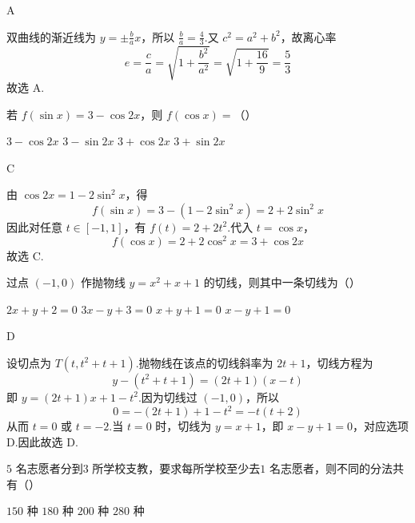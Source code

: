 \begin{answer}
A
\end{answer}

\begin{solution}
双曲线的渐近线为 \(y=\pm\frac{b}{a}x\)，所以
\(\frac{b}{a}=\frac43\).又 \(c^{2}=a^{2}+b^{2}\)，故离心率
\[
e=\frac ca=\sqrt{1+\frac{b^{2}}{a^{2}}}=\sqrt{1+\frac{16}{9}}=\frac53
\]
故选 A.
\end{solution}

\begin{problem}
若 \( f(\sin x) = 3 - \cos 2x \)，则 \( f(\cos x) = \)（\quad）

\choices
    {\(3 - \cos 2x\)}
    {\(3 - \sin 2x\)}
    {\(3 + \cos 2x\)}
    {\(3 + \sin 2x\)}
\end{problem}

\begin{answer}
C
\end{answer}

\begin{solution}
由 \(\cos2x=1-2\sin^{2}x\)，得
\[
f(\sin x)=3-(1-2\sin^{2}x)=2+2\sin^{2}x
\]
因此对任意 \(t\in[-1,1]\)，有 \(f(t)=2+2t^{2}\).代入 \(t=\cos x\)，
\[
f(\cos x)=2+2\cos^{2}x=3+\cos2x
\]
故选 C.
\end{solution}

\begin{problem}
过点 \((-1,0)\) 作抛物线 \(y = x^{2} + x + 1\) 的切线，则其中一条切线为（\quad）

\choices
    {\(2x + y + 2 = 0\)}
    {\(3x - y + 3 = 0\)}
    {\(x + y + 1 = 0\)}
    {\(x - y + 1 = 0\)}
\end{problem}

\begin{answer}
D
\end{answer}

\begin{solution}
设切点为 \(T(t,t^{2}+t+1)\).抛物线在该点的切线斜率为 \(2t+1\)，切线方程为
\[
y-(t^{2}+t+1)=(2t+1)(x-t)
\]
即 \(y=(2t+1)x+1-t^{2}\).因为切线过 \((-1,0)\)，所以
\[
0=-(2t+1)+1-t^{2}=-t(t+2)
\]
从而 \(t=0\) 或 \(t=-2\).当 \(t=0\) 时，切线为 \(y=x+1\)，即
\(x-y+1=0\)，对应选项 D.因此故选 D.
\end{solution}

\begin{problem}
\(5\text{ 名}\)志愿者分到\(3\text{ 所}\)学校支教，要求每所学校至少去\(1\text{ 名}\)志愿者，则不同的分法共有（\quad）

\choices
    {\(150\text{ 种}\)}
    {\(180\text{ 种}\)}
    {\(200\text{ 种}\)}
    {\(280\text{ 种}\)}
\end{problem}

